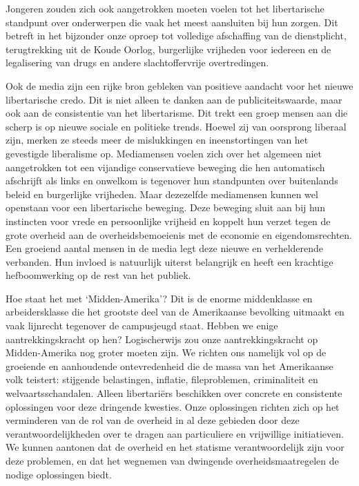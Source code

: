 \documentclass[
  a5paper,
  smalldemyvopaper,10pt,twoside,onecolumn,openright,extrafontsizes,hidelinks]{memoir}
\begin{document}
Jongeren zouden zich ook aangetrokken moeten voelen tot het
libertarische standpunt over onderwerpen die vaak het meest aansluiten
bij hun zorgen. Dit betreft in het bijzonder onze oproep tot volledige
afschaffing van de dienstplicht, terugtrekking uit de Koude Oorlog,
burgerlijke vrijheden voor iedereen en de legalisering van drugs en
andere slachtoffervrije overtredingen.

Ook de media zijn een rijke bron gebleken van positieve aandacht voor
het nieuwe libertarische credo. Dit is niet alleen te danken aan de
publiciteitswaarde, maar ook aan de consistentie van het libertarisme.
Dit trekt een groep mensen aan die scherp is op nieuwe sociale en
politieke trends. Hoewel zij van oorsprong liberaal zijn, merken ze
steeds meer de mislukkingen en ineenstortingen van het gevestigde
liberalisme op. Mediamensen voelen zich over het algemeen niet
aangetrokken tot een vijandige conservatieve beweging die hen
automatisch afschrijft als links en onwelkom is tegenover hun
standpunten over buitenlands beleid en burgerlijke vrijheden. Maar
dezezelfde mediamensen kunnen wel openstaan voor een libertarische
beweging. Deze beweging sluit aan bij hun instincten voor vrede en
persoonlijke vrijheid en koppelt hun verzet tegen de grote overheid aan
de overheidsbemoeienis met de economie en eigendomsrechten. Een groeiend
aantal mensen in de media legt deze nieuwe en verhelderende verbanden.
Hun invloed is natuurlijk uiterst belangrijk en heeft een krachtige
hefboomwerking op de rest van het publiek.

Hoe staat het met `Midden-Amerika'? Dit is de enorme middenklasse en
arbeidersklasse die het grootste deel van de Amerikaanse bevolking
uitmaakt en vaak lijnrecht tegenover de campusjeugd staat. Hebben we
enige aantrekkingskracht op hen? Logischerwijs zou onze
aantrekkingskracht op Midden-Amerika nog groter moeten zijn. We richten
ons namelijk vol op de groeiende en aanhoudende ontevredenheid die de
massa van het Amerikaanse volk teistert: stijgende belastingen,
inflatie, fileproblemen, criminaliteit en welvaartsschandalen. Alleen
libertariërs beschikken over concrete en consistente oplossingen voor
deze dringende kwesties. Onze oplossingen richten zich op het
verminderen van de rol van de overheid in al deze gebieden door deze
verantwoordelijkheden over te dragen aan particuliere en vrijwillige
initiatieven. We kunnen aantonen dat de overheid en het statisme
verantwoordelijk zijn voor deze problemen, en dat het wegnemen van
dwingende overheidsmaatregelen de nodige oplossingen biedt.
\end{document}
